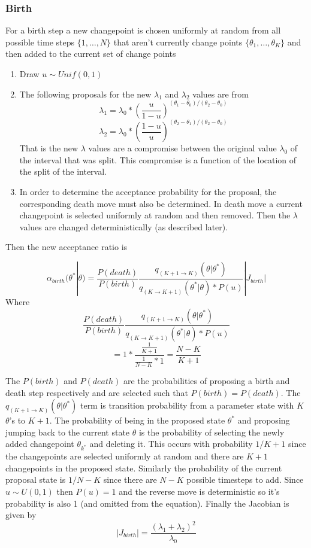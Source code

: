 \documentclass[]{article}
\numberwithin{equation}{section}
\begin{document}
\hypertarget{birth}{%
\subsubsection{Birth}\label{birth}}

For a birth step a new changepoint is chosen uniformly at random from
all possible time steps \(\{1,\dots,N\}\) that aren't currently change
points \(\{\theta_1,\dots,\theta_K\}\) and then added to the current set
of change points

\begin{enumerate}
\def\labelenumi{\arabic{enumi}.}
\item
  Draw \(u \sim Unif(0,1)\)
\item
  The following proposals for the new \(\lambda_1\) and \(\lambda_2\)
  values are from
  \[\lambda_1 = \lambda_0*(\frac{u}{1-u})^{(\theta_1-\theta_0)/(\theta_2-\theta_0)}\]
  \[\lambda_2 = \lambda_0*(\frac{1-u}{u})^{(\theta_2-\theta_1)/(\theta_2-\theta_0)}\]
  That is the new \(\lambda\) values are a compromise between the
  original value \(\lambda_0\) of the interval that was split. This
  compromise is a function of the location of the split of the interval.
\item
  In order to determine the acceptance probability for the proposal, the
  corresponding death move must also be determined. In death move a
  current changepoint is selected uniformly at random and then removed.
  Then the \(\lambda\) values are changed deterministically (as
  described later).
\end{enumerate}

Then the new acceptance ratio is

\[\alpha_{birth}(\theta^*|\theta) = \frac{P(death)}{P(birth)}\frac{q_{(K+1\rightarrow K)}(\theta|\theta^*)}{q_{(K\rightarrow K + 1)}(\theta^*|\theta)*P(u)}|J_{birth}|\]
Where
\[  \frac{P(death)}{P(birth)}\frac{q_{(K+1\rightarrow K)}(\theta|\theta^*)}{q_{(K\rightarrow K + 1)}(\theta^*|\theta)*P(u)} \]
\[= 1*\frac{\frac{1}{K+1}}{\frac{1}{N-K}*1} = \frac{N-K}{K+1} \]

The \(P(birth)\) and \(P(death)\) are the probabilities of proposing a
birth and death step respectively and are selected such that
\(P(birth) = P(death)\). The \(q_{(K+1\rightarrow K)}(\theta|\theta^*)\)
term is transition probability from a parameter state with \(K\)
\(\theta\)'s to \(K+1\). The probability of being in the proposed state
\(\theta^*\) and proposing jumping back to the current state \(\theta\)
is the probability of selecting the newly added changepoint
\(\theta_{k^*}\) and deleting it. This occurs with probability \(1/K+1\)
since the changepoints are selected uniformly at random and there are
\(K+1\) changepoints in the proposed state. Similarly the probability of
the current proposal state is \(1/N-K\) since there are \(N-K\) possible
timesteps to add. Since \(u \sim U(0,1)\) then \(P(u) = 1\) and the
reverse move is deterministic so it's probability is also 1 (and omitted
from the equation). Finally the Jacobian is given by
\[ |J_{birth}| = \frac{(\lambda_1 + \lambda_2)^2}{\lambda_0}\]
\end{document}
